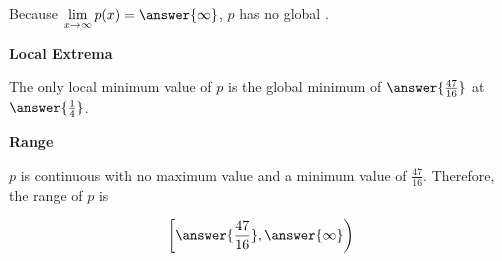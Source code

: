 \documentclass{ximera}
\begin{document}
\begin{exercise}
\begin{question}
Because $\lim\limits_{x \to \infty} p(x) = \answer{\infty}$, $p$ has no global .

\end{question}












\begin{question}  \textbf{\textcolor{blue!55!black}{Local Extrema}}

The only local minimum value of $p$ is the global minimum of $\answer{\frac{47}{16}}$ at $\answer{\frac{1}{4}}$.

\end{question}







\begin{question}  \textbf{\textcolor{blue!55!black}{Range}}

$p$ is continuous with no maximum value and a minimum value of $\frac{47}{16}$.  Therefore, the range of $p$ is

\[
\left[ \answer{\frac{47}{16}}, \answer{\infty} \right)
\]

\end{question}


\end{exercise}
\end{document}
